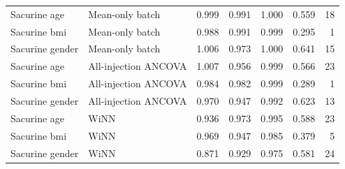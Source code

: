 \begin{landscape}
\begin{longtable}{p{3cm}p{3.4cm}rrrrr}
Sacurine age & Mean-only batch & 0.999 & 0.991 & 1.000 & 0.559 & 18 \\
Sacurine bmi & Mean-only batch & 0.988 & 0.991 & 0.999 & 0.295 & 1 \\
Sacurine gender & Mean-only batch & 1.006 & 0.973 & 1.000 & 0.641 & 15 \\
Sacurine age & All-injection ANCOVA & 1.007 & 0.956 & 0.999 & 0.566 & 23 \\
Sacurine bmi & All-injection ANCOVA & 0.984 & 0.982 & 0.999 & 0.289 & 1 \\
Sacurine gender & All-injection ANCOVA & 0.970 & 0.947 & 0.992 & 0.623 & 13 \\
Sacurine age & WiNN & 0.936 & 0.973 & 0.995 & 0.588 & 23 \\
Sacurine bmi & WiNN & 0.969 & 0.947 & 0.985 & 0.379 & 5 \\
Sacurine gender & WiNN & 0.871 & 0.929 & 0.975 & 0.581 & 24 \\
\end{longtable}
\end{landscape}
